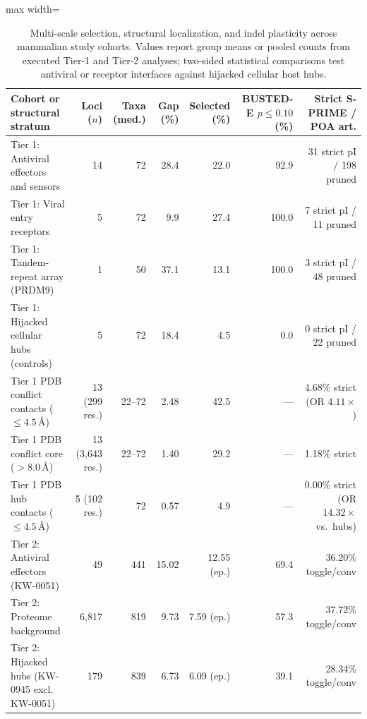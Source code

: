 \begin{table}[htbp]
\centering
\caption{Multi-scale selection, structural localization, and indel plasticity across mammalian study cohorts. Values report group means or pooled counts from executed Tier-1 and Tier-2 analyses; two-sided statistical comparisons test antiviral or receptor interfaces against hijacked cellular host hubs.}
\label{tab:arms_summary}
\footnotesize
\setlength{\tabcolsep}{4.5pt}
\begin{adjustbox}{max width=\textwidth}
\begin{tabular}{@{}l r r r r r r@{}}
\toprule
Cohort or structural stratum & Loci ($n$) & Taxa (med.) & Gap (\%) & Selected (\%) & BUSTED-E $p \le 0.10$ (\%) & Strict S-PRIME / POA art. \\
\midrule
Tier 1: Antiviral effectors and sensors & 14 & 72 & 28.4 & 22.0 & 92.9 & 31 strict pI / 198 pruned \\
Tier 1: Viral entry receptors & 5 & 72 & 9.9 & 27.4 & 100.0 & 7 strict pI / 11 pruned \\
Tier 1: Tandem-repeat array (PRDM9) & 1 & 50 & 37.1 & 13.1 & 100.0 & 3 strict pI / 48 pruned \\
Tier 1: Hijacked cellular hubs (controls) & 5 & 72 & 18.4 & 4.5 & 0.0 & 0 strict pI / 22 pruned \\
\midrule
Tier 1 PDB conflict contacts ($\le 4.5$\,\AA) & 13 (299 res.) & 22--72 & 2.48 & 42.5 & --- & 4.68\% strict (OR $4.11\times$) \\
Tier 1 PDB conflict core ($>8.0$\,\AA) & 13 (3,643 res.) & 22--72 & 1.40 & 29.2 & --- & 1.18\% strict \\
Tier 1 PDB hub contacts ($\le 4.5$\,\AA) & 5 (102 res.) & 72 & 0.57 & 4.9 & --- & 0.00\% strict (OR $14.32\times$ vs.\ hubs) \\
\midrule
Tier 2: Antiviral effectors (KW-0051) & 49 & 441 & 15.02 & 12.55 (ep.) & 69.4 & 36.20\% toggle/conv \\
Tier 2: Proteome background & 6,817 & 819 & 9.73 & 7.59 (ep.) & 57.3 & 37.72\% toggle/conv \\
Tier 2: Hijacked hubs (KW-0945 excl. KW-0051) & 179 & 839 & 6.73 & 6.09 (ep.) & 39.1 & 28.34\% toggle/conv \\
\bottomrule
\end{tabular}
\end{adjustbox}
\end{table}
